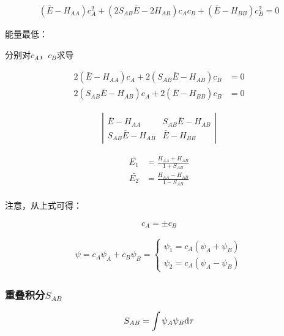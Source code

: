 \begin{align*}
	\left( \bar{E} - H_{AA} \right) c_A^2 + \left( 2S_{AB} \bar{E} - 2H_{AB}   \right)c_Ac_B + \left(  \bar{E} - H_{BB} \right)c_B^2 = 0
\end{align*}


能量最低：

分别对$c_A$，$c_B$求导


\begin{align*}
	2 \left(  \bar{E} - H_{AA}  \right)c_A + 2 \left( S_{AB} \bar{E} - H_{AB}  \right)c_B & = 0 \\
	2 \left(  S_{AB}\bar{E} - H_{AB} \right)c_A + 2 \left( \bar{E} - H_{BB}  \right)c_B   & = 0
\end{align*}


\begin{align*}
	\left| \begin{array}{cc}
		       \bar{E} - H_{AA}        & S_{AB} \bar{E} - H_{AB} \\
		       S_{AB} \bar{E} - H_{AB} & \bar{E} - H_{BB}
	       \end{array} \right|
\end{align*}

\begin{align*}
	\bar{E_1} & = \frac{H_{AA} + H_{AB}}{1 + S_{AB}} \\
	\bar{E_2} & = \frac{H_{AA} - H_{AB}}{1 - S_{AB}} \\
\end{align*}

注意，从上式可得：

\begin{equation*}
	c_A = \pm c_B
\end{equation*}

\begin{align*}
	\psi = c_A \psi_A + c_B \psi_B = \begin{cases}
		                                 \psi_1 = c_A(\psi_A + \psi_B) \\
		                                 \psi_2 = c_A(\psi_A - \psi_B)
	                                 \end{cases}
\end{align*}



\subsubsection{重叠积分$S_{AB}$}

\begin{equation*}
	S_{AB} = \int \psi_A \psi_B \mathrm{d} \tau
\end{equation*}


